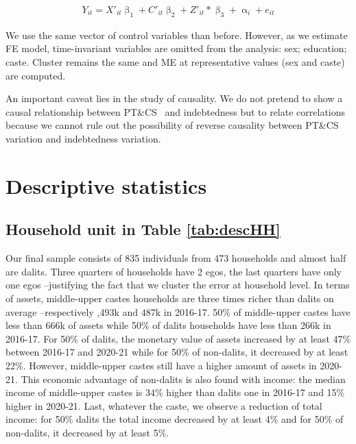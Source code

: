 \documentclass[a4paper, 12pt, onecolumn]{article}
\newcommand{\PTCS}{PT\&CS}
\begin{document}
\begin{equation}\label{eq:fe}
\begin{split}
Y_{it}=X'_{it}\upbeta_{1}+C'_{it}\upbeta_{2}+Z'_{it}*\upbeta_{3}+\upalpha_{i}+e_{it}
\end{split}
\end{equation}

We use the same vector of control variables than before.
However, as we estimate FE model, time-invariant variables are omitted from the analysis: sex; education; caste. 
Cluster remains the same and ME at representative values (sex and caste) are computed.

An important caveat lies in the study of causality.
We do not pretend to show a causal relationship between \PTCS~ and indebtedness but to relate correlations because we cannot rule out the possibility of reverse causality between \PTCS~ variation and indebtedness variation.



\section{Descriptive statistics}
\label{section:descstat}

	\subsection{Household unit in Table \ref{tab:descHH}}

Our final sample consists of 835 individuals from 473 households and almost half are dalits.
Three quarters of households have 2 egos, the last quarters have only one egos --justifying the fact that we cluster the error at household level.
In terms of assets, middle-upper castes households are three times richer than dalits on average --respectively ,493k and \rupee487k in 2016-17.
50\% of middle-upper castes have less than \rupee666k of assets while 50\% of dalits households have less than \rupee266k in 2016-17.
For 50\% of dalits, the monetary value of assets increased by at least 47\% between 2016-17 and 2020-21 while for 50\% of non-dalits, it decreased by at least 22\%.
However, middle-upper castes still have a higher amount of assets in 2020-21.
This economic advantage of non-dalits is also found with income: the median income of middle-upper castes is 34\% higher than dalits one in 2016-17 and 15\% higher in 2020-21.
Last, whatever the caste, we observe a reduction of total income: for 50\% dalits the total income decreased by at least 4\% and for 50\% of non-dalits, it decreased by at least 5\%.
		
\end{document}
